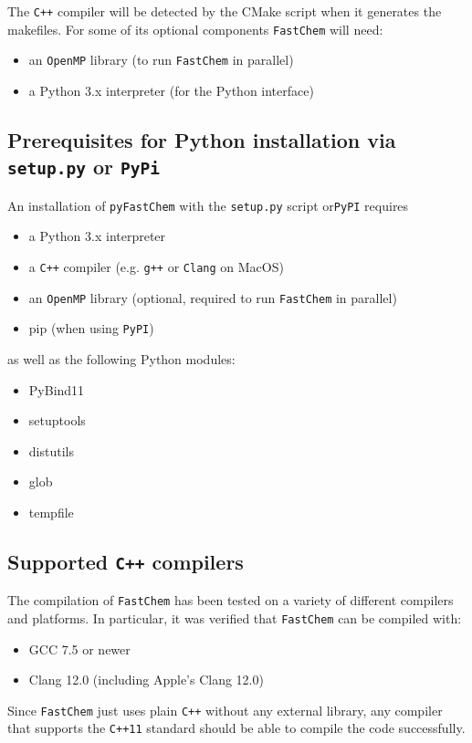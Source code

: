 \documentclass[numbers=noenddot]{aux/fcmanual}
\newcommand{\fc}{\texttt{FastChem}\xspace}
\newcommand{\pfc}{\texttt{pyFastChem}\xspace}
\newcommand{\cpp}{\ttt{C++}\xspace}
\newcommand{\ttt}[1]{\texttt {#1}}
\begin{document}
The \ttt{C++} compiler will be detected by the CMake script when it generates the makefiles. For some of its optional components \fc will need:
\begin{itemize}
	\item an \ttt{OpenMP} library (to run \fc in parallel)
	\item a Python 3.x interpreter (for the Python interface)
\end{itemize}


\subsection{Prerequisites for Python installation via \ttt{setup.py} or \ttt{PyPi} }
An installation of \pfc with the \verb|setup.py| script or\verb|PyPI| requires
\begin{itemize}
	\item a Python 3.x interpreter
	\item a \ttt{C++} compiler (e.g. \ttt{g++} or \ttt{Clang} on MacOS)
	\item an \ttt{OpenMP} library (optional, required to run \fc in parallel)
	\item pip (when using \verb|PyPI|)
\end{itemize}
as well as the following Python modules:
\begin{itemize}
	\item PyBind11 
	\item setuptools
	\item distutils
	\item glob
	\item tempfile
\end{itemize}


\subsection{Supported \ttt{C++} compilers}

The compilation of \fc has been tested on a variety of different compilers and platforms. In particular, it was verified that \fc can be compiled with:
\begin{itemize}
	\item GCC 7.5 or newer
	\item Clang 12.0 (including Apple's Clang 12.0)
\end{itemize}

Since \fc just uses plain \cpp without any external library, any compiler that supports the \ttt{C++11} standard should be able to compile the code successfully.
\end{document}
